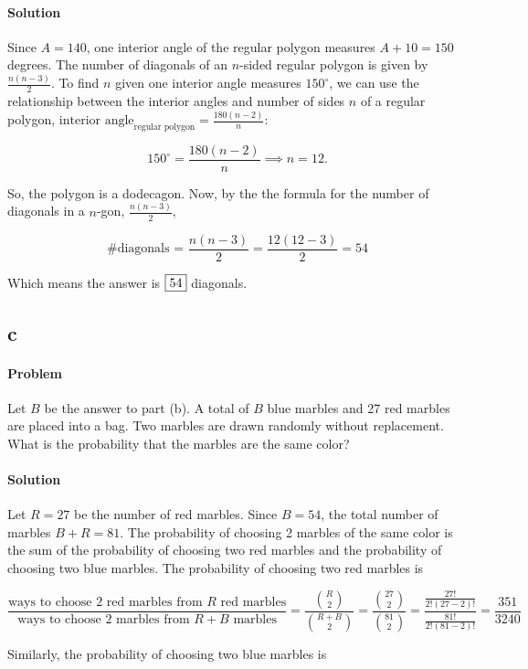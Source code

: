 \documentclass[10pt]{article}
\theoremstyle{plain}
\theoremstyle{definition}
\theoremstyle{remark}
\begin{document}
\paragraph{Solution} Since \(A=140\), one interior angle of the regular polygon measures \(A+10=150\) degrees. The number of diagonals of an \(n\)-sided regular polygon is given by \(\frac{n(n-3)}{2}\). To find \(n\) given one interior angle measures \(150^{\circ}\), we can use the relationship between the interior angles and number of sides \(n\) of a regular polygon, \(\text{interior angle}_{\text{regular polygon}} = \frac{180(n - 2)}{n}\):

\[150^{\circ}=\frac{180(n-2)}{n}\implies n=12.\]

So, the polygon is a dodecagon. Now, by the the formula for the number of diagonals in a \(n\)-gon, \(\frac{n(n-3)}{2}\),

\[\text{\# diagonals = }\frac{n(n-3)}{2}=\frac{12(12-3)}{2}=54\]

Which means the answer is \(\fbox{54}\) diagonals.

\subsection{c}

\paragraph{Problem} Let \(B\) be the answer to part (b). A total of \(B\) blue marbles and 27 red marbles are placed into a bag. Two marbles are drawn randomly without replacement. What is the probability that the marbles are the same color?

\paragraph{Solution} Let \(R=27\) be the number of red marbles. Since \(B=54\), the total number of marbles \(B+R=81\). The probability of choosing 2 marbles of the same color is the sum of the probability of choosing two red marbles and the probability of choosing two blue marbles. The probability of choosing two red marbles is 

\[\frac{\text{ways to choose 2 red marbles from \(R\) red marbles}}{\text{ways to choose 2 marbles from \(R+B\) marbles}}=\frac{\binom{R}{2}}{\binom{R+B}{2}}=\frac{\binom{27}{2}}{\binom{81}{2}}=\frac{\frac{27!}{2!(27-2)!}}{\frac{81!}{2!(81-2)!}}=\frac{351}{3240}\]

Similarly, the probability of choosing two blue marbles is
\end{document}
